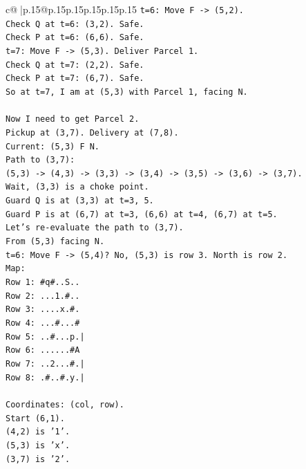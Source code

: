 \documentclass{article}
\begin{document}
{\begin{supertabular}{c@{$\;$}|p{.15\linewidth}@{}p{.15\linewidth}p{.15\linewidth}p{.15\linewidth}p{.15\linewidth}p{.15\linewidth}}
{{{\texttt{t=6: Move F {-}> (5,2).} \\
\texttt{Check Q at t=6: (3,2). Safe.} \\
\texttt{Check P at t=6: (6,6). Safe.} \\
\texttt{t=7: Move F {-}> (5,3). Deliver Parcel 1.} \\
\texttt{Check Q at t=7: (2,2). Safe.} \\
\texttt{Check P at t=7: (6,7). Safe.} \\
\texttt{So at t=7, I am at (5,3) with Parcel 1, facing N.} \\
\\ 
\texttt{Now I need to get Parcel 2.} \\
\texttt{Pickup at (3,7). Delivery at (7,8).} \\
\texttt{Current: (5,3) F N.} \\
\texttt{Path to (3,7):} \\
\texttt{(5,3) {-}> (4,3) {-}> (3,3) {-}> (3,4) {-}> (3,5) {-}> (3,6) {-}> (3,7).} \\
\texttt{Wait, (3,3) is a choke point.} \\
\texttt{Guard Q is at (3,3) at t=3, 5.} \\
\texttt{Guard P is at (6,7) at t=3, (6,6) at t=4, (6,7) at t=5.} \\
\texttt{Let's re{-}evaluate the path to (3,7).} \\
\texttt{From (5,3) facing N.} \\
\texttt{t=6: Move F {-}> (5,4)? No, (5,3) is row 3. North is row 2.} \\
\texttt{Map:} \\
\texttt{Row 1: \#q\#..S..} \\
\texttt{Row 2: ...1.\#..} \\
\texttt{Row 3: ....x.\#.} \\
\texttt{Row 4: ...\#...\#} \\
\texttt{Row 5: ..\#...p.|} \\
\texttt{Row 6: ......\#A} \\
\texttt{Row 7: ..2...\#.|} \\
\texttt{Row 8: .\#..\#.y.|} \\
\\ 
\texttt{Coordinates: (col, row).} \\
\texttt{Start (6,1).} \\
\texttt{(4,2) is '1'.} \\
\texttt{(5,3) is 'x'.} \\
\texttt{(3,7) is '2'.} \\
}}}
\end{supertabular}}
\end{document}
